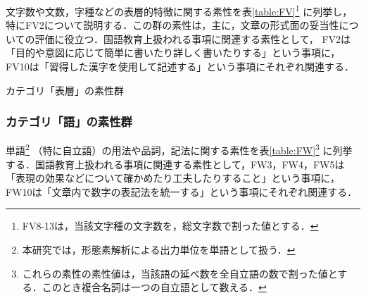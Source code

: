 \documentclass[japanese]{jnlp_1.5}
\let\underline
\newenvironment{indent1zw}{}{}
\begin{document}
文字数や文数，字種などの表層的特徴に関する素性を表\ref{table:FV}\footnote{
	FV8-13は，当該文字種の文字数を，総文字数で割った値とする．}
に列挙し，特にFV2について説明する．この群の素性は，主に，文章の形式面の妥当性についての評価に役立つ．国語教育上扱われる事項に関連する素性として， FV2は「目的や意図に応じて簡単に書いたり詳しく書いたりする」\cite{MonbuKagakuSho2008}という事項に， FV10は「習得した漢字を使用して記述する」という事項にそれぞれ関連する．

\begin{table}[b]
\caption{カテゴリ「表層」の素性群}
\label{table:FV}

\vspace{-1\Cvs}
\end{table}



\subsubsection{カテゴリ「語」の素性群}

単語\footnote{
	本研究では，形態素解析による出力単位を単語として扱う．}
（特に自立語）の用法や品詞，記法に関する素性を表\ref{table:FW}\footnote{
	これらの素性の素性値は，当該語の延べ数を全自立語の数で割った値とする．このとき複合名詞は一つの自立語として数える．}
に列挙する．国語教育上扱われる事項に関連する素性として，FW3，FW4，FW5は「表現の効果などについて確かめたり工夫したりすること」\cite{MonbuKagakuSho2008}という事項に， FW10は「文章内で数字の表記法を統一する」という事項にそれぞれ関連する．
\end{document}
